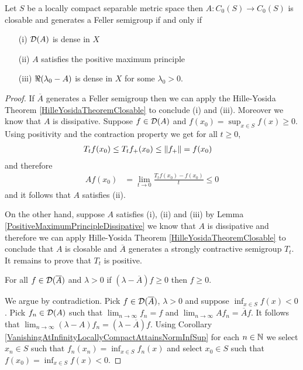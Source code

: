 \begin{thm}\label{HilleYosidaTheoremFellerSemigroup} Let $S$ be a locally compact separable metric space then $A: C_0(S) \to C_0(S)$ is closable and generates a Feller semigroup if and only if 
\begin{itemize}
\item[(i)] $ \mathcal{D}(A)$ is dense in $X$
\item[(ii)] $A$ satisfies the positive maximum principle
\item[(iii)] $\Re(\lambda_0 -A)$ is dense in $X$ for some $\lambda_0 > 0$.
\end{itemize}
\end{thm}
\begin{proof}
If $\overline{A}$ generates a Feller semigroup then we can apply the Hille-Yosida Theorem \ref{HilleYosidaTheoremClosable} to conclude (i) and (iii).  Moreover we know that $A$ is dissipative.  Suppose $f \in \mathcal{D}(A)$  and $f(x_0) = \sup_{x \in S} f(x) \geq 0$.  Using positivity and the contraction property we get for all $t \geq 0$,
\begin{align*}
T_t f (x_0) &\leq T_t f_+(x_0) \leq \left \lVert f_+ \right \rVert = f(x_0)
\end{align*}
and therefore 
\begin{align*}
Af(x_0) &= \lim_{t \to 0} \frac{T_t f(x_0) - f(x_0)}{t} \leq 0
\end{align*}
and it follows that $A$ satisfies (ii).

On the other hand, suppose $A$ satisfies (i), (ii) and (iii) by Lemma \ref{PositiveMaximumPrincipleDissipative} we know that $A$ is dissipative and therefore we can apply 
Hille-Yosida Theorem \ref{HilleYosidaTheoremClosable} to conclude that $A$ is closable and $\overline{A}$ generates a strongly contractive semigroup $T_t$.  It remains
to prove that $T_t$ is positive.  

\begin{clm}\label{HilleYosidaFeller:ResolventPositivity}For all $f \in \mathcal{D}(\overline{A})$ and $\lambda > 0$ if $(\lambda - \overline{A}) f \geq 0$ then $f \geq 0$.
\end{clm}

We argue by contradiction.  Pick $f \in \mathcal{D}(\overline{A})$, $\lambda > 0$ and suppose $\inf_{x \in S} f(x) < 0$.  Pick $f_n \in \mathcal{D}(A)$ such that 
$\lim_{n \to \infty} f_n = f$ and $\lim_{n \to \infty} A f_n = \overline{A} f$.  It follows that $\lim_{n \to \infty} (\lambda - A) f_n = (\lambda - \overline{A}) f$.  Using Corollary \ref{VanishingAtInfinityLocallyCompactAttainsNormInfSup}  for each $n \in \mathbb{N}$ we select
$x_n \in S$ such that $f_n(x_n) = \inf_{x \in S} f_n(x)$ and select $x_0 \in S$ such that $f(x_0) = \inf_{x \in S} f(x) < 0$.


\end{proof}
